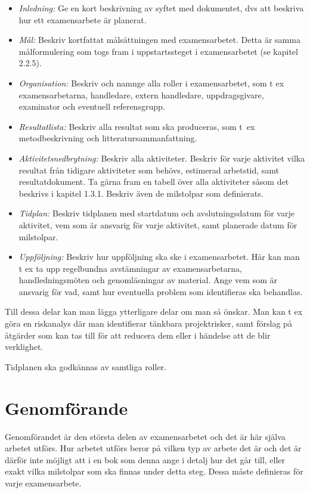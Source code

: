 \begin{itemize}
\item
  \emph{Inledning:} Ge en kort beskrivning av syftet med dokumentet, dvs
  att beskriva hur ett examensarbete är planerat.
\item
  \emph{Mål:} Beskriv kortfattat målsättningen med examensarbetet. Detta
  är samma målformulering som togs fram i uppstartssteget i
  examensarbetet (se kapitel 2.2.5).
\item
  \emph{Organisation:} Beskriv och namnge alla roller i examensarbetet,
  som t ex examensarbetarna, handledare, extern handledare,
  uppdragsgivare, examinator och eventuell referensgrupp.
\item
  \emph{Resultatlista:} Beskriv alla resultat som ska produceras, som
  t~ex metodbeskrivning och litteratursammanfattning.
\item
  \emph{Aktivitetsnedbrytning:} Beskriv alla aktiviteter. Beskriv för
  varje aktivitet vilka resultat från tidigare aktiviteter som behövs,
  estimerad arbetstid, samt resultatdokument. Ta gärna fram en tabell
  över alla aktiviteter såsom det beskrivs i kapitel 1.3.1. Beskriv även
  de milstolpar som definierats.
\item
  \emph{Tidplan:} Beskriv tidplanen med startdatum och avslutningsdatum
  för varje aktivitet, vem som är ansvarig för varje aktivitet, samt
  planerade datum för milstolpar.
\item
  \emph{Uppföljning:} Beskriv hur uppföljning ska ske i examensarbetet.
  Här kan man t ex ta upp regelbundna avstämningar av examensarbetarna,
  handledningsmöten och genomläsningar av material. Ange vem som är
  ansvarig för vad, samt hur eventuella problem som identifieras ska
  behandlas.
\end{itemize}

Till dessa delar kan man lägga ytterligare delar om man så önskar. Man
kan t ex göra en riskanalys där man identifierar tänkbara projektrisker,
samt förslag på åtgärder som kan tas till för att reducera dem eller i
händelse att de blir verklighet.

Tidplanen ska godkännas av samtliga roller.

\section{Genomförande}\label{genomfuxf6rande}

Genomförandet är den största delen av examensarbetet och det är här
själva arbetet utförs. Hur arbetet utförs beror på vilken typ av arbete
det är och det är därför inte möjligt att i en bok som denna ange i
detalj hur det går till, eller exakt vilka milstolpar som ska finnas
under detta steg. Dessa måste definieras för varje examensarbete.

